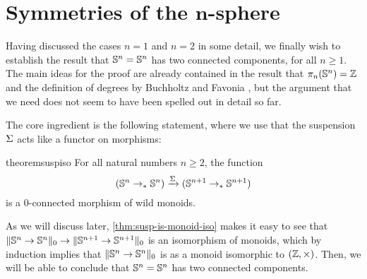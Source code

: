 \documentclass[english,a4]{article}
\newcommand{\setTrunc}[1]{\Trunc{#1}_0}
\begin{document}
\section{Symmetries of the $\boldsymbol n$-sphere}
\label{sec:higher-sphere}



Having discussed the cases $n = 1$ and $n = 2$ in some detail, we finally wish to establish the result that ${\mathbb S^{n}} = {\mathbb S^{n}}$ has two connected components, for all $n \geq 1$.
The main ideas for the proof are already contained in the result that $\pi_n({\mathbb S^{n}}) = \mathbb{Z}$ \cite{licataBrunerie_s1again} and the definition of degrees by Buchholtz and Favonia \cite{Buchholtz2018CellularCI}, but the argument that we need does not seem to have been spelled out in detail so far.

The core ingredient is the following statement,
where we use that the suspension $\operatorname{\Sigma}$ acts like a functor on morphisms:
\begin{restatable}{theorem}{suspiso}
    \label{thm:susp-is-monoid-iso}
    For all natural numbers $n \geq 2$, the function
    \begin{equation} \label{eq:susp-monoid-morphism}
    ({\mathbb S^{n}} \to_* {\mathbb S^{n}}) \xrightarrow{\operatorname{\Sigma}} ({\mathbb S^{n+1}} \to_* {\mathbb S^{n+1}})
    \end{equation}
    is a $0$-connected morphism of wild monoids.
\end{restatable}

As we will discuss later, \cref{thm:susp-is-monoid-iso} makes it easy to see
that $\setTrunc {\Sn n \to \Sn n} \to \setTrunc {\Sn {n+1} \to \Sn {n+1}}$ is
an isomorphism of monoids, which by induction implies that $\setTrunc {\Sn n
\to \Sn n}$ is as a monoid isomorphic to $(\mathbb{Z}, \times)$. Then, we will be able
to conclude that ${\mathbb S^{n}} = {\mathbb S^{n}}$ has two connected components.
\end{document}
